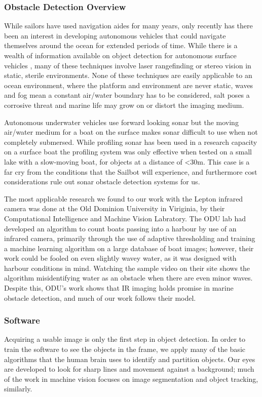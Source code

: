 
\subsubsection{\label{sec:discussion:theory:detectionoverview}Obstacle Detection Overview}
While sailors have used navigation aides for many years, only recently has there been an interest in developing autonomous vehicles that could navigate themselves around the ocean for extended periods of time. While there is a wealth of information available on object detection for autonomous surface vehicles \cite{detection-offroad} \cite{optical-flow-detection} \cite{unmanned-ground-vehicles}, many of these techniques involve laser rangefinding or stereo vision in static, sterile environments. None of these techniques are easily applicable to an ocean environment, where the platform and environment are never static, waves and fog mean a constant air/water boundary has to be considered, salt poses a corrosive threat and marine life may grow on or distort the imaging medium. 

Autonomous underwater vehicles use forward looking sonar but the moving air/water medium for a boat on the surface makes sonar difficult to use when not completely submersed. While profiling sonar has been used in a research capacity on a surface boat\cite{ASV-sonar} the profiling system was only effective when tested on a small lake with a slow-moving boat, for objects at a distance of <30m. This case is a far cry from the conditions that the Sailbot will experience, and furthermore cost considerations rule out sonar obstacle detection systems for us.


The most applicable research we found to our work with the Lepton infrared camera was done at the Old Dominion University in Viriginia, by their Computational Intelligence and Machine Vision Labratory. The ODU lab had developed an algorithm to count boats passing into a harbour by use of an infrared camera, primarily through the use of adaptive thresholding and training a machine learning algorithm on a large database of boat images; however, their work could be fooled on even slightly wavey water, as it was designed with harbour conditions in mind. Watching the sample video on their site shows the algorithm misidentifying water as an obstacle when there are even minor waves.\cite{ODU-boat-IR-detection} Despite this, ODU's work shows that IR imaging holds promise in marine obstacle detection, and much of our work follows their model.

\subsubsection{\label{sec:discussion:theory:detectionsoftware}Software}
Acquiring a usable image is only the first step in object detection. In order to train the software to see the objects in the frame, we apply many of the basic algorithms that the human brain uses to identify and partition objects. Our eyes are developed to look for sharp lines and movement against a background; much of the work in machine vision focuses on image segmentation and object tracking, similarly. 

